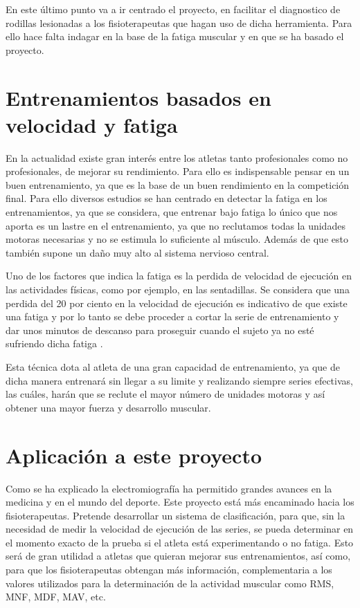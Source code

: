 En este último punto va a ir centrado el proyecto, en facilitar el diagnostico de rodillas lesionadas a los fisioterapeutas que hagan uso de dicha herramienta. Para ello hace falta indagar en la base de la fatiga muscular y en que se ha basado el proyecto.

\section{Entrenamientos basados en velocidad y fatiga}
En la actualidad existe gran interés entre los atletas tanto profesionales como no profesionales, de mejorar su rendimiento. Para ello es indispensable pensar en un buen entrenamiento, ya que es la base de un buen rendimiento en la competición final. Para ello diversos estudios se han centrado en detectar la fatiga en los entrenamientos, ya que se considera, que entrenar bajo fatiga lo único que nos aporta es un lastre en el entrenamiento, ya que no reclutamos todas la unidades motoras necesarias y no se estimula lo suficiente al músculo. Además de que esto también supone un daño muy alto al sistema nervioso central.

Uno de los factores que indica la fatiga es la perdida de velocidad de ejecución en las actividades físicas, como por ejemplo, en las sentadillas. Se considera que una perdida del 20 por ciento en la velocidad de ejecución es indicativo de que existe una fatiga y por lo tanto se debe proceder a cortar la serie de entrenamiento y dar unos minutos de descanso para proseguir cuando el sujeto ya no esté sufriendo dicha fatiga \cite{fernandezpropuesta}.

Esta técnica dota al atleta de una gran capacidad de entrenamiento, ya que de dicha manera entrenará sin llegar a su limite y realizando siempre series efectivas, las cuáles, harán que se reclute el mayor número de unidades motoras y así obtener una mayor fuerza y desarrollo muscular. 

\section{Aplicación a este proyecto}

Como se ha explicado la electromiografía ha permitido grandes avances en la medicina y en el mundo del deporte. Este proyecto está más encaminado hacia los fisioterapeutas. Pretende desarrollar un sistema de clasificación, para que, sin la necesidad de medir la velocidad de ejecución de las series, se pueda determinar en el momento exacto de la prueba si el atleta está experimentando o no fatiga. Esto será de gran utilidad a atletas que quieran mejorar sus entrenamientos, así como, para que los fisioterapeutas obtengan más información, complementaria a los valores utilizados para la determinación de la actividad muscular como RMS, MNF, MDF, MAV, etc. 

